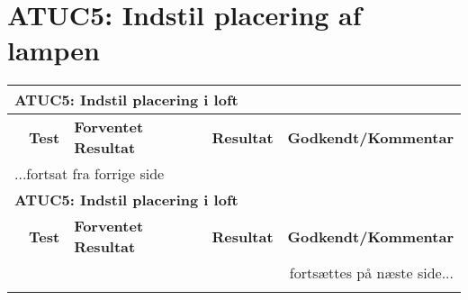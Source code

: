 \section{ATUC5: Indstil placering af lampen}

\begin{center} \centering
    \begin{longtable}{|p{}|p{}|p{}|p{}|p{}|}
    \hline
        \multicolumn{5}{|l|}{\textbf{ATUC5: Indstil placering i loft}} \\ \hline
        \multicolumn{1}{|c|}{} &
        \textbf{Test} &
        \textbf{Forventet \newline Resultat} &
        \textbf{Resultat} &
        \textbf{Godkendt\slash \newline Kommentar} \\ \hline 
        \endfirsthead

        \multicolumn{5}{l}{...fortsat fra forrige side} \\ \hline 
        \multicolumn{5}{|l|}{\textbf{ATUC5: Indstil placering i loft}} \\ \hline
        \multicolumn{1}{|c|}{} &
        \textbf{Test} &
        \textbf{Forventet \newline Resultat} &
        \textbf{Resultat} &
        \textbf{Godkendt\slash \newline Kommentar} \\ \hline 
        \endhead

        \multicolumn{5}{r}{fortsættes på næste side...} \\
        \endfoot
        \endlastfoot
        

\end{longtable}
\end{center}
